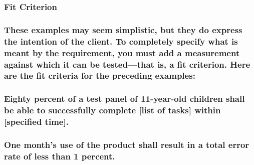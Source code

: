 \documentclass[
]{article}
\begin{document}
\hypertarget{fit-criterion-3}{%
\subsubsection{Fit Criterion}\label{fit-criterion-3}}

\hypertarget{these-examples-may-seem-simplistic-but-they-do-express-the-intention-of-the-client.-to-completely-specify-what-is-meant-by-the-requirement-you-must-add-a-measurement-against-which-it-can-be-testedthat-is-a-fit-criterion.-here-are-the-fit-criteria-for-the-preceding-examples}{%
\subsubsection{\texorpdfstring{These examples may seem simplistic, but
they do express the intention of the client. To completely specify what
is meant by the requirement, you must add a measurement against which it
can be tested---that is, a fit criterion. Here are the fit criteria for
the preceding examples:
}{These examples may seem simplistic, but they do express the intention of the client. To completely specify what is meant by the requirement, you must add a measurement against which it can be tested---that is, a fit criterion. Here are the fit criteria for the preceding examples: }}\label{these-examples-may-seem-simplistic-but-they-do-express-the-intention-of-the-client.-to-completely-specify-what-is-meant-by-the-requirement-you-must-add-a-measurement-against-which-it-can-be-testedthat-is-a-fit-criterion.-here-are-the-fit-criteria-for-the-preceding-examples}}

\hypertarget{eighty-percent-of-a-test-panel-of-11-year-old-children-shall-be-able-to-successfully-complete-list-of-tasks-within-specified-time.}{%
\subsubsection{Eighty percent of a test panel of 11-year-old children
shall be able to successfully complete {[}list of tasks{]} within
{[}specified
time{]}.}\label{eighty-percent-of-a-test-panel-of-11-year-old-children-shall-be-able-to-successfully-complete-list-of-tasks-within-specified-time.}}

\hypertarget{one-months-use-of-the-product-shall-result-in-a-total-error-rate-of-less-than-1-percent.}{%
\subsubsection{One month's use of the product shall result in a total
error rate of less than 1
percent.}\label{one-months-use-of-the-product-shall-result-in-a-total-error-rate-of-less-than-1-percent.}}
\end{document}
